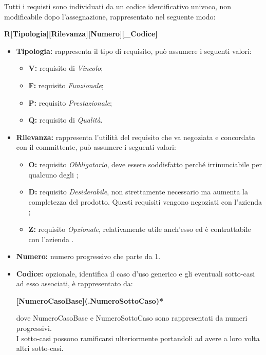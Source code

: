 \label{ClassificazioneRequisiti}
Tutti i requisti sono individuati da un codice identificativo univoco, non modificabile dopo l'assegnazione, rappresentato nel seguente modo:

\begin{center}
	\textbf{R[Tipologia][Rilevanza][Numero][\_Codice]}
\end{center}

\begin{itemize}
	\item \textbf{Tipologia:} rappresenta il tipo di requisito, può assumere i seguenti valori:
	\begin{itemize}
		\item \textbf{V:} requisito di \textit{Vincolo};
		\item \textbf{F:} requisito \textit{Funzionale};
		\item \textbf{P:} requisito \textit{Prestazionale};
		\item \textbf{Q:} requisito di \textit{Qualità}.
	\end{itemize}

	\item \textbf{Rilevanza:} rappresenta l'utilità del requisito che va negoziata e concordata con il committente, può assumere i seguenti valori:
	\begin{itemize}
		\item \textbf{O:} requisito \textit{Obbligatorio}, deve essere soddisfatto perché irrinunciabile per qualcuno degli ;
		\item \textbf{D:} requisito \textit{Desiderabile}, non strettamente necessario ma aumenta la completezza del prodotto. Questi requisiti vengono negoziati con l'azienda \Proponente;
		\item \textbf{Z:} requisito \textit{Opzionale}, relativamente utile anch'esso ed è contrattabile con l'azienda \Proponente.
	\end{itemize}

	\item \textbf{Numero:} numero progressivo che parte da 1.
	
	\item \textbf{Codice:} opzionale, identifica il caso d'uso generico e gli eventuali sotto-casi ad esso associati, è rappresentato da:
	\begin{center}
		\textbf{[NumeroCasoBase](.NumeroSottoCaso)*}
	\end{center}
	dove NumeroCasoBase e NumeroSottoCaso sono rappresentati da numeri progressivi. \\
	I sotto-casi possono ramificarsi ulteriormente portandoli ad avere a loro volta altri sotto-casi.
\end{itemize}

